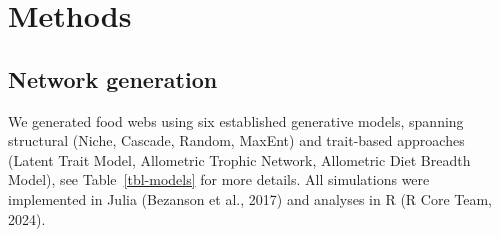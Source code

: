 \documentclass[
]{article}
\begin{document}
\section{Methods}\label{methods}

\subsection{Network generation}\label{network-generation}

We generated food webs using six established generative models, spanning
structural (Niche, Cascade, Random, MaxEnt) and trait-based approaches
(Latent Trait Model, Allometric Trophic Network, Allometric Diet Breadth
Model), see Table~\ref{tbl-models} for more details. All simulations
were implemented in Julia (Bezanson et al., 2017) and analyses in R (R
Core Team, 2024).
\end{document}
